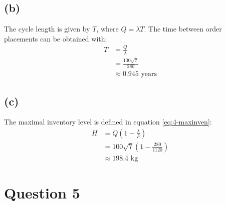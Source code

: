 \documentclass[12pt]{article}
\begin{document}
\subsection*{(b)}   

The cycle length is given by $T$, where $Q = \lambda T$. The time between order placements can be obtained with: \begin{align*}
    T &= \frac{Q}{\lambda} \\ 
    &= \frac{100\sqrt{7}}{280} \\ 
    &\approx \boxed{0.945 \text{ years}}
\end{align*}

\subsection*{(c)}   

The maximal inventory level is defined in equation \ref{eq:4-maxinven}: \begin{align*}
    H &= Q\left( 1- \frac{\lambda}{P} \right) \\ 
    &= 100\sqrt{7} \left( 1 - \frac{280}{1120} \right) \\ 
    &\approx \boxed{198.4 \text{ kg}}
\end{align*}

\newpage 

\section*{Question 5}

\end{document}
